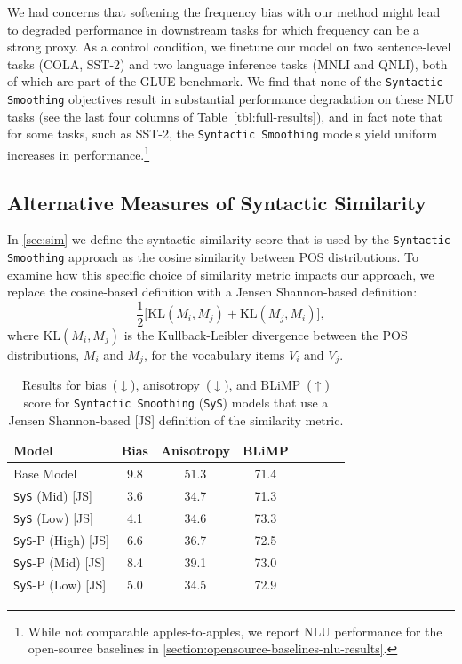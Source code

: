 We had concerns that softening the frequency bias with our method might lead to degraded performance in downstream tasks for which frequency can be a strong proxy. As a control condition, we finetune our model on two sentence-level tasks (COLA, SST-2) and two language inference tasks (MNLI and QNLI), both of which are part of the GLUE \citep{wang2018glue} benchmark. We find that none of the \texttt{Syntactic Smoothing} objectives result in substantial performance degradation on these NLU tasks (see the last four columns of Table~\cref{tbl:full-results}), and in fact note that for some tasks, such as SST-2, the \texttt{Syntactic Smoothing} models yield uniform increases in performance.\footnote{While not comparable apples-to-apples, we report NLU performance for the open-source baselines in \cref{section:opensource-baselines-nlu-results}.}  

\subsection{Alternative Measures of Syntactic Similarity}

In \cref{sec:sim} we define the syntactic similarity score that is used by the \texttt{Syntactic Smoothing} approach as the cosine similarity between POS distributions. To examine how this specific choice of similarity metric impacts our approach, we replace the cosine-based definition with a Jensen Shannon-based definition:
$$ \frac{1}{2}\big[ \text{KL}(M_i, M_j ) + \text{KL}(M_j, M_i)\big],$$
where KL$(M_i, M_j)$ is the Kullback-Leibler divergence between the POS distributions, $M_i$ and $M_j$, for the vocabulary items $V_i$ and $V_j$.

\begin{table}[ht!]
\centering
\small
\begin{tabular}{l||cc|ccccc}
\toprule
\textbf{Model}  &  \textbf{Bias}  & \textbf{Anisotropy} & \textbf{BLiMP} \\
\midrule
Base Model & 9.8 & 51.3 & 71.4  \\
\midrule
\texttt{SyS} (Mid) \hspace{0.42cm} [JS]  & 3.6 & 34.7 & 71.3 \\
\texttt{SyS} (Low) \hspace{0.38cm} [JS]  & 4.1 & 34.6 & 73.3  \\
\texttt{SyS}-P (High) \hspace{0.05cm} [JS] & 6.6 & 36.7  & 72.5  \\ 
\texttt{SyS}-P (Mid) \hspace{0.15cm} [JS] & 8.4 & 39.1 &  73.0 \\ 
\texttt{SyS}-P (Low) \hspace{0.12cm} [JS] & 5.0 &  34.5 & 72.9 \\ 
\bottomrule
\end{tabular}
\caption{\label{tbl:jsd-similarity-metric-results}
Results for bias~($\downarrow$), anisotropy~($\downarrow$), and BLiMP~($\uparrow$) score for \texttt{Syntactic Smoothing} (\texttt{SyS}) models that use a Jensen Shannon-based [JS] definition of the similarity metric.}
\end{table}


